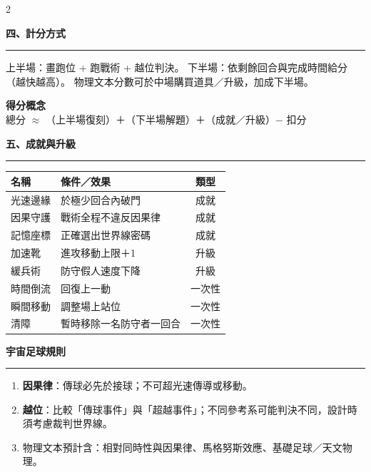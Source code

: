 \documentclass[12pt]{article}
\newcommand{\secHead}[1]{%
  \par\noindent\vspace{0.85em}%
  {\fontsize{26}{30}\selectfont\bfseries #1\par}%
  \noindent\rule{\linewidth}{1.2pt}\par
  \vspace{0.4em}%
  \noindent
}
\begin{document}
\begin{multicols}{2}
\secHead{四、計分方式}

上半場：畫跑位 + 跑戰術 + 越位判決。
下半場：依剩餘回合與完成時間給分（越快越高）。
物理文本分數可於中場購買道具／升級，加成下半場。

\vspace{0.5em}
\noindent
\begin{tcolorbox}[
  colback=white, colframe=black, boxrule=1.2pt, arc=2pt,
  left=12pt, right=12pt, top=10pt, bottom=10pt,
  width=\linewidth, fontupper=\large]
\noindent\textbf{得分概念}\\[6pt]
\noindent 總分 $\approx$ （上半場復刻）＋（下半場解題）＋（成就／升級）$-$ 扣分
\end{tcolorbox}

\secHead{五、成就與升級}

\noindent
{\normalsize
\renewcommand{\arraystretch}{1.35}
\begin{tabularx}{\dimexpr\linewidth-2pt\relax}{|l|>{\raggedright\arraybackslash}X|c|}
\hline
\textbf{名稱} & \textbf{條件／效果} & \textbf{類型} \\
\hline
光速邊緣 & 於極少回合內破門 & 成就 \\
\hline
因果守護 & 戰術全程不違反因果律 & 成就 \\
\hline
記憶座標 & 正確選出世界線密碼 & 成就 \\
\hline
加速靴 & 進攻移動上限＋1 & 升級 \\
\hline
緩兵術 & 防守假人速度下降 & 升級 \\
\hline
時間倒流 & 回復上一動 & 一次性 \\
\hline
瞬間移動 & 調整場上站位 & 一次性 \\
\hline
清障 & 暫時移除一名防守者一回合 & 一次性 \\
\hline
\end{tabularx}}

\secHead{宇宙足球規則}

\begin{enumerate}
  \item \textbf{因果律}：傳球必先於接球；不可超光速傳導或移動。
  \item \textbf{越位}：比較「傳球事件」與「超越事件」；不同參考系可能判決不同，設計時須考慮裁判世界線。
  \item 物理文本預計含：相對同時性與因果律、馬格努斯效應、基礎足球／天文物理。
\end{enumerate}

\end{multicols}
\end{document}

